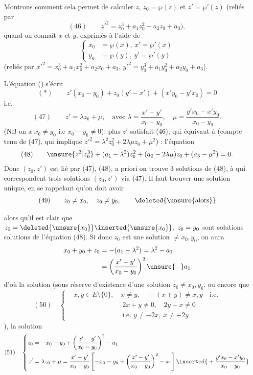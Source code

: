 Montrons comment cela permet de calculer $z$, 
$z_0=\wp(z)$ et $z'=\wp'(z)$ (reliés par
\[
(46)\qquad z'^2=z_0^3+a_1z_0^2+a_2z_0+a_3),
\]
quand on connaît $x$ et $y$, exprimés à l'aide de
\[
\left\{\begin{aligned}
x_0&=\wp(x),\ x'=\wp'(x)\\
y_0&=\wp(y),\ y'=\wp'(y)
\end{aligned}\right.
\]
(reliés par $x'^2=x_0^3+a_1x_0^2+a_2x_0+a_3$, $y'^2=y_0^3+a_1y_0^2+a_2y_0+a_3$).

L'équation () s'écrit
\[
(*)\qquad z'(x_0-y_0)+z_0(y'-x')+(x'y_0-y'x_0)=0
\]
i.e.
\[
(47)\qquad z'=\lambda z_0+\mu,\quad\text{avec }\lambda=\frac{x'-y'}{x_0-y_0},\quad
\mu=\frac{y'x_0-x'y_0}{x_0-y_0}.
\]
 (NB on a $x_0\ne y_0$ i.e $x_0-y_0\ne0$).
 plus $z'$ satisfait (46), qui équivaut à
 (compte tenu de (47), qui implique
$z'^2=\lambda^2z_0^2+2\lambda\mu z_0+\mu^2$) : l'équation
\[
(48)\qquad \unsure{z^3|z_0^3}+(a_1-\lambda^2)z_0^2+(a_2-2\lambda\mu)z_0+(a_3-\mu^2)=0.
\]
Donc $(z_0,z')$ est lié par (47), (48), a priori on trouve 3 solutions
 de (48), à qui correspondent trois solutions $(z_0,z')$ via (47).
Il faut trouver une solution unique, en se rappelant qu'on doit avoir
\[
(49)\qquad z_0\ne x_0,\quad z_0\ne y_0,\qquad\deleted{\text{\unsure{alors}}}
\]


alors qu'il est clair que $z_0=\deleted{\unsure{x_0}}\inserted{\unsure{x_0}},\ z_0=y_0$
sont solutions solutions de l'équation (48).
Si donc $z_0$ est une solution $\ne x_0,y_0$, on aura
\[
\begin{aligned}
x_0+y_0+z_0&=-(a_1-\lambda^2)=\lambda^2-a_1\\
&=\left(\frac{x'-y'}{x_0-y_0}\right)^2\unsure{-}a_1
\end{aligned}
\]
d'où la solution (sous réserve d'existence d'une solution $z_0\ne x_0,y_0$,
ou encore   que
\[
(50)\quad\left\{\begin{aligned}
&x,y\in E\setminus\{0\},\quad x\ne y,\quad -(x+y)\ne x,y\quad\text{i.e.}\\
&\hspace{3cm}2x+y\ne0,\quad2y+x\ne0\\
&\hspace{3cm}\text{i.e. }y\ne-2x,\ x\ne-2y
\end{aligned}\right.
\]
), la solution
\[
(51)\quad\left\{\begin{aligned}
z_0&=-x_0-y_0+\left(\frac{x'-y'}{x_0-y_0}\right)^2-a_1\\
z'&=\lambda z_0+\mu=\frac{x'-y'}{x_0-y_0}
\left[-x_0-y_0+\left(\frac{x'-y'}{x_0-y_0}\right)^2-a_1\right]
\inserted{{}+\frac{y'x_0-x'y_0}{x_0-y_0}}
\end{aligned}\right.
\]

